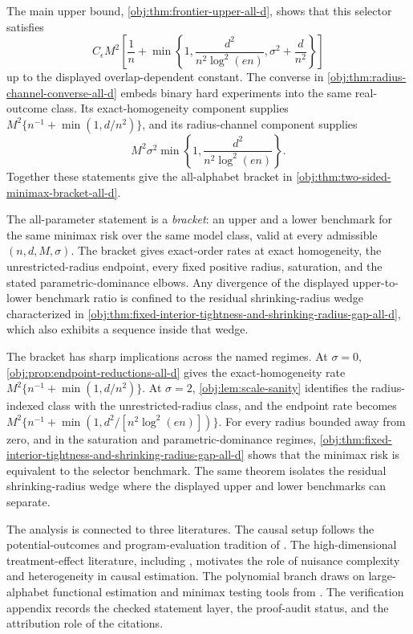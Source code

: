 \documentclass[11pt]{article}
\begin{document}
The main upper bound, \cref{obj:thm:frontier-upper-all-d}, shows that this selector satisfies
\[
C_\epsilon M^2
\left[
\frac1n+
\min\left\{
1,\frac{d^2}{n^2\log^2(en)},\sigma^2+\frac d{n^2}
\right\}
\right]
\]
up to the displayed overlap-dependent constant. The converse in \cref{obj:thm:radius-channel-converse-all-d} embeds binary hard experiments into the same real-outcome class. Its exact-homogeneity component supplies \(M^2\{n^{-1}+\min(1,d/n^2)\}\), and its radius-channel component supplies
\[
M^2\sigma^2
\min\left\{1,\frac{d^2}{n^2\log^2(en)}\right\}.
\]
Together these statements give the all-alphabet bracket in \cref{obj:thm:two-sided-minimax-bracket-all-d}.

The all-parameter statement is a \emph{bracket}: an upper and a lower benchmark for the same minimax risk over the same model class, valid at every admissible \((n,d,M,\sigma)\). The bracket gives exact-order rates at exact homogeneity, the unrestricted-radius endpoint, every fixed positive radius, saturation, and the stated parametric-dominance elbows. Any divergence of the displayed upper-to-lower benchmark ratio is confined to the residual shrinking-radius wedge characterized in \cref{obj:thm:fixed-interior-tightness-and-shrinking-radius-gap-all-d}, which also exhibits a sequence inside that wedge.

The bracket has sharp implications across the named regimes. At \(\sigma=0\), \cref{obj:prop:endpoint-reductions-all-d} gives the exact-homogeneity rate \(M^2\{n^{-1}+\min(1,d/n^2)\}\). At \(\sigma=2\), \cref{obj:lem:scale-sanity} identifies the radius-indexed class with the unrestricted-radius class, and the endpoint rate becomes \(M^2\{n^{-1}+\min(1,d^2/[n^2\log^2(en)])\}\). For every radius bounded away from zero, and in the saturation and parametric-dominance regimes, \cref{obj:thm:fixed-interior-tightness-and-shrinking-radius-gap-all-d} shows that the minimax risk is equivalent to the selector benchmark. The same theorem isolates the residual shrinking-radius wedge where the displayed upper and lower benchmarks can separate.

The analysis is connected to three literatures. The causal setup follows the potential-outcomes and program-evaluation tradition of \citet{Rubin1974,Rubin1979,RosenbaumRubin1983,Hahn1998,Robins1994,VanderLaan2003,Tsiatis2006,Imbens2009,ImbensRubin2015}. The high-dimensional treatment-effect literature, including \citet{Belloni2017,Chernozhukov2018,Wager2018,Nie2021,Semenova2021,Kennedy2022,Kennedy2023,Yadlowsky2022,Celentano2023,Jiang2025}, motivates the role of nuisance complexity and heterogeneity in causal estimation. The polynomial branch draws on large-alphabet functional estimation and minimax testing tools from \citet{Paninski2003,Valiant2011a,Valiant2011b,Valiant2016,Valiant2017,JiaoVenkatHanWeissman2015,WuYang2016Entropy,Wu2019,LeCam1986,Tsybakov2009,Cai2011,Donoho1990,Timan1963}. The verification appendix records the checked statement layer, the proof-audit status, and the attribution role of the citations.
\end{document}
